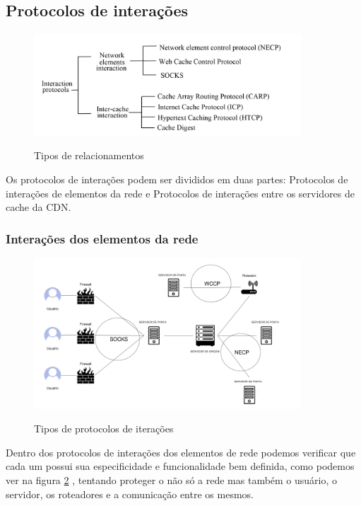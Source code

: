 \subsection{Protocolos de intera\c{c}\~oes}

\begin{figure}[h]
\caption{Tipos de relacionamentos}
\includegraphics[width=10cm]{Figuras/tipos_relacionamentos.png} 
\label{figura:tipos_relacionamentos}
\end{figure}

Os protocolos de intera\c{c}\~oes podem ser divididos em duas partes: Protocolos de intera\c{c}\~oes de elementos da rede e Protocolos de intera\c{c}\~oes entre os servidores de cache da CDN. 


\subsubsection{Intera\c{c}\~oes dos elementos da rede}
\begin{figure}[h]
\caption{Tipos de protocolos de itera\c{c}\~oes}
\includegraphics[width=10cm]{Figuras/protocolos_interacao_elementos.png} 
\label{figura:protocolos_interacao_elementos}
\end{figure}

Dentro dos protocolos de intera\c{c}\~oes dos elementos de rede podemos verificar que cada um possui sua especificidade e funcionalidade bem definida, como podemos ver na figura \ref{figura:protocolos_interacao_elementos} , tentando proteger o n\~ao s\'o a rede mas tamb\'em o usu\'ario, o servidor, os roteadores e a comunica\c{c}\~ao entre os mesmos.


